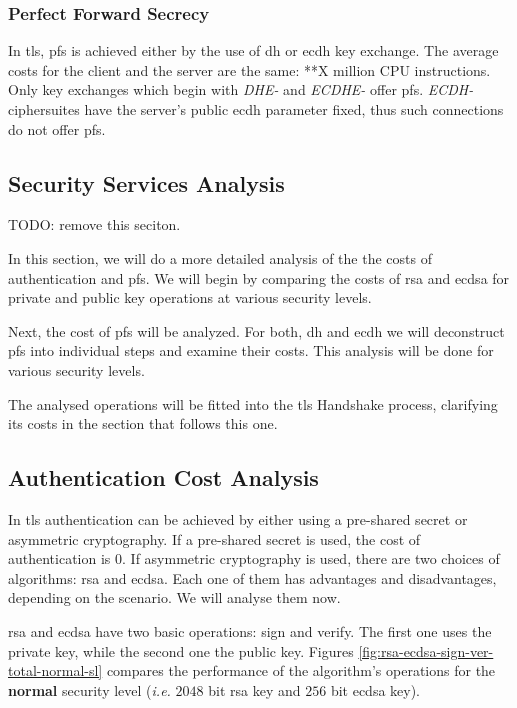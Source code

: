 \documentclass{llncs}
\begin{document}
\subsubsection{Perfect Forward Secrecy}

In \gls{tls}, \gls{pfs} is achieved either by the use of \gls{dh} or \gls{ecdh} key exchange. The average costs for the
client and the server are the same: **X million CPU instructions. Only key exchanges which begin with \textit{DHE-} and
\textit{ECDHE-} offer \gls{pfs}. \textit{ECDH-} ciphersuites have the server's public \gls{ecdh} parameter fixed, thus
such connections do not offer \gls{pfs}.

\subsection{Security Services Analysis}

TODO: remove this seciton.

In this section, we will do a more detailed analysis of the the costs of authentication and \gls{pfs}.
We will begin by comparing the costs of \gls{rsa} and \gls{ecdsa} for private and public key operations at various
security levels. 

Next, the cost of \gls{pfs} will be analyzed. For both, \gls{dh} and \gls{ecdh} we will deconstruct \gls{pfs} into 
individual steps and examine their costs. This analysis will be done for various security levels. 

The analysed operations will be fitted into the \gls{tls} Handshake process, clarifying its costs in the section that
follows this one.

\subsection{Authentication Cost Analysis}

In \gls{tls} authentication can be achieved by either using a pre-shared secret or asymmetric cryptography. 
If a pre-shared secret is used, the cost of authentication is $0$. If asymmetric cryptography is used, there are two
choices of algorithms: \gls{rsa} and \gls{ecdsa}. Each one of them has advantages and disadvantages, depending on the
scenario. We will analyse them now.

\gls{rsa} and \gls{ecdsa} have two basic operations: sign and verify. The first one uses the private key, while the
second one the public key. Figures \ref{fig:rsa-ecdsa-sign-ver-total-normal-sl} compares the performance of the algorithm's
operations for the \textbf{normal} security level (\textit{i.e.} $2048$ bit \gls{rsa} key and $256$ bit \gls{ecdsa} key).
\end{document}
